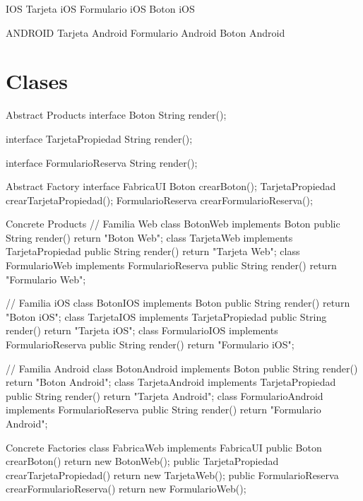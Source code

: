 \begin{itemize}
\begin{salida}
IOS
Tarjeta iOS
Formulario iOS
Boton iOS

ANDROID
Tarjeta Android
Formulario Android
Boton Android
\end{salida}


\section{Clases}

\begin{codigof}{Abstract Products}
interface Boton {
    String render();
}

interface TarjetaPropiedad {
    String render();
}

interface FormularioReserva {
    String render();
}
\end{codigof}

\begin{codigof}{Abstract Factory}
 interface FabricaUI {
    Boton crearBoton();
    TarjetaPropiedad crearTarjetaPropiedad();
    FormularioReserva crearFormularioReserva();
}
\end{codigof}

\begin{codigof}{Concrete Products}
// Familia Web
class BotonWeb implements Boton {
    public String render() { return "Boton Web"; }
}
class TarjetaWeb implements TarjetaPropiedad {
    public String render() { return "Tarjeta Web"; }
}
class FormularioWeb implements FormularioReserva {
    public String render() { return "Formulario Web"; }
}

// Familia iOS
class BotonIOS implements Boton {
    public String render() { return "Boton iOS"; }
}
class TarjetaIOS implements TarjetaPropiedad {
    public String render() { return "Tarjeta iOS"; }
}
class FormularioIOS implements FormularioReserva {
    public String render() { return "Formulario iOS"; }
}

// Familia Android
class BotonAndroid implements Boton {
    public String render() { return "Boton Android"; }
}
class TarjetaAndroid implements TarjetaPropiedad {
    public String render() { return "Tarjeta Android"; }
}
class FormularioAndroid implements FormularioReserva {
    public String render() { return "Formulario Android"; }
}
\end{codigof}

\begin{codigof}{Concrete Factories}
class FabricaWeb implements FabricaUI {
    public Boton crearBoton() { return new BotonWeb(); }
    public TarjetaPropiedad crearTarjetaPropiedad() { return new TarjetaWeb(); }
    public FormularioReserva crearFormularioReserva() { return new FormularioWeb(); }
}


\end{codigof}
\end{itemize}

